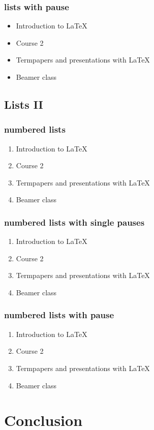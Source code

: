 \documentclass[hyperref={pdfpagelabels=false}]{beamer}
\begin{document}
\begin{frame}\frametitle{lists with pause}
	\begin{itemize}[<+->]
		\item Introduction to  \LaTeX{}  
		\item Course 2
		\item Termpapers and presentations with \LaTeX{}  
		\item Beamer class
	\end{itemize} 
\end{frame}

\subsection{Lists II}

\begin{frame}\frametitle{numbered lists}
	\begin{enumerate}
		\item Introduction to  \LaTeX{}   
		\item Course 2 
		\item Termpapers and presentations with \LaTeX{}  
		\item Beamer class
	\end{enumerate}
\end{frame}

\begin{frame}
	\frametitle{numbered lists with single pauses}
	\begin{enumerate}
		\item Introduction to  \LaTeX{}  \pause 
		\item Course 2 \pause 
		\item Termpapers and presentations with \LaTeX{}  \pause 
		\item Beamer class
	\end{enumerate}
\end{frame}

\begin{frame}
	\frametitle{numbered lists with pause}
	\begin{enumerate}[<+->]
		\item Introduction to  \LaTeX{}  
		\item Course 2
		\item Termpapers and presentations with \LaTeX{}  
		\item Beamer class
	\end{enumerate}
\end{frame}


\section{Conclusion}
\end{document}
